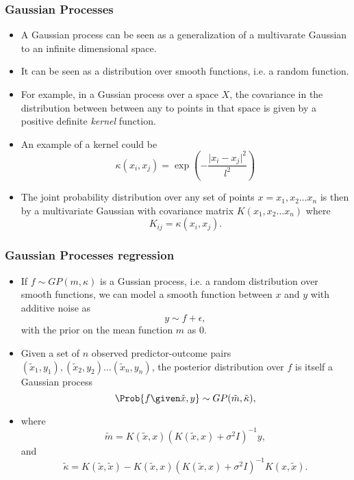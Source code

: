 \documentclass{slides}
\begin{document}
\begin{frame}
	\frametitle{Gaussian Processes}
	\begin{itemize}
		\item A Gaussian process can be seen as a generalization of a multivarate Gaussian to an infinite dimensional space.
		\item It can be seen as a distribution over smooth functions, i.e. a random function.
		\item For example, in a Gussian process over a space $X$, the covariance in the distribution between between any to points in that space is given by a positive definite \emph{kernel} function.
		\item An example of a kernel could be 
			\[
				\kappa(x_i, x_j) = \exp\left( - \frac{\vert x_i - x_j \vert^2}{l^2} \right)
			\]
		\item The joint probability distribution over any set of points $x = x_1, x_2 \ldots x_n$ is then by a multivariate Gaussian with covariance matrix $K(x_1, x_2 \ldots x_n)$ where \[K_{ij} = \kappa(x_i, x_j).\]
	\end{itemize}
\end{frame}

\begin{frame}
	\frametitle{Gaussian Processes regression}
	\begin{itemize}
		\item If $f \sim GP(m, \kappa)$ is a Gussian process, i.e. a random distribution over smooth functions, we can model a smooth function between $x$ and $y$ with additive noise as 
			\[
				y \sim f + \epsilon,
			\]
		with the prior on the mean function $m$ as $0$.
	\item Given a set of $n$ observed predictor-outcome pairs $(\tilde{x}_1, y_1), (\tilde{x}_2, y_2) \ldots (\tilde{x}_n, y_n)$, the posterior distribution over $f$ is itself a Gaussian process 
		\[ \Prob{f\given \tilde{x}, y} \sim GP(\tilde{m}, \tilde{\kappa}),\]
		\item 
			where 
			\[\tilde{m} = K(\tilde{x}, x) ( K(\tilde{x}, x) + \sigma^2 I)^{-1} y,\]
			and 
			\[\tilde{\kappa} = K(\tilde{x}, \tilde{x}) - K(\tilde{x}, x) ( K(\tilde{x}, x) + \sigma^2 I)^{-1} K(x, \tilde{x}).\]
	\end{itemize}
\end{frame}
\end{document}
